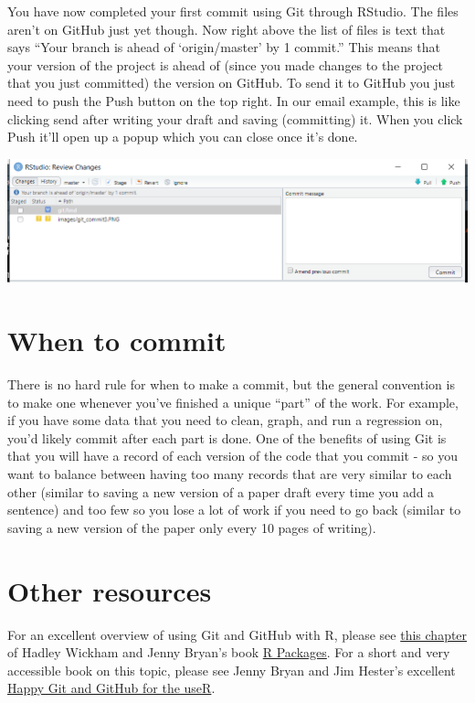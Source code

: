\documentclass[
  12pt,
  openany]{book}
\begin{document}
You have now completed your first commit using Git through RStudio. The files aren't on GitHub just yet though. Now right above the list of files is text that says ``Your branch is ahead of `origin/master' by 1 commit.'' This means that your version of the project is ahead of (since you made changes to the project that you just committed) the version on GitHub. To send it to GitHub you just need to push the Push button on the top right. In our email example, this is like clicking send after writing your draft and saving (committing) it. When you click Push it'll open up a popup which you can close once it's done.

\includegraphics{images/git_commit4.PNG}

\hypertarget{when-to-commit}{%
\section{When to commit}\label{when-to-commit}}

There is no hard rule for when to make a commit, but the general convention is to make one whenever you've finished a unique ``part'' of the work. For example, if you have some data that you need to clean, graph, and run a regression on, you'd likely commit after each part is done. One of the benefits of using Git is that you will have a record of each version of the code that you commit - so you want to balance between having too many records that are very similar to each other (similar to saving a new version of a paper draft every time you add a sentence) and too few so you lose a lot of work if you need to go back (similar to saving a new version of the paper only every 10 pages of writing).

\hypertarget{other-resources}{%
\section{Other resources}\label{other-resources}}

For an excellent overview of using Git and GitHub with R, please see \href{https://r-pkgs.org/Git.html}{this chapter} of Hadley Wickham and Jenny Bryan's book \href{https://r-pkgs.org/}{R Packages}. For a short and very accessible book on this topic, please see Jenny Bryan and Jim Hester's excellent \href{https://happyGitwithr.com/}{Happy Git and GitHub for the useR}.
\end{document}
